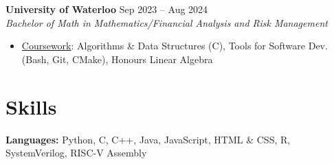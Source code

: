\documentclass[10pt,letterpaper]{article}
\begin{document}

\raggedright
\textbf{University of Waterloo} \hfill
Sep 2023 -- Aug 2024 \\
\textit{Bachelor of Math in Mathematics/Financial Analysis and Risk Management} \hfill
\begin{itemize}
    \item \underline{Coursework}: 
    Algorithms \& Data Structures (C), 
    Tools for Software Dev. (Bash, Git, CMake), 
    Honours Linear Algebra
\end{itemize}













\section{Skills}

\hspace{0.75em}\textbf{Languages:} 
    Python, C, C++, Java, JavaScript, HTML \& CSS, R, SystemVerilog, RISC-V Assembly \\
\end{document}
